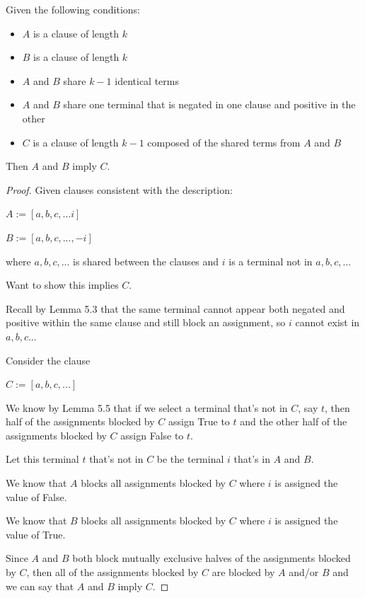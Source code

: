 \documentclass[manuscript]{acmart}
\begin{document}
    \begin{lemma}[Reduction]
        Given the following conditions:
        \begin{itemize}
            \item $A$ is a clause of length $k$
            \item $B$ is a clause of length $k$
            \item $A$ and $B$ share $k-1$ identical terms
            \item $A$ and $B$ share one terminal that is negated in one clause
            and positive in the other
            \item $C$ is a clause of length $k-1$ composed of the shared terms
            from $A$ and $B$
        \end{itemize}
        Then $A$ and $B$ imply $C$.
    \end{lemma}
    \begin{proof}
        Given clauses consistent with the description:

        $A := [a, b, c, ... i]$

        $B := [a, b, c, ..., -i]$

        where $a, b, c, ...$ is shared between the clauses and $i$ is a terminal not in $a, b, c, ...$

        Want to show this implies $C$.

        Recall by Lemma 5.3 that the same terminal cannot appear both negated and positive within the same clause and still block an assignment, so $i$ cannot exist in $a, b, c...$

        Consider the clause

        $C := [a, b, c, ...]$

        We know by Lemma 5.5 that if we select a terminal that's not in $C$, say $t$, then half of the assignments blocked by $C$ assign True to $t$ and the other half of the assignments blocked by $C$ assign False to $t$.

        Let this terminal $t$ that's not in $C$ be the terminal $i$ that's in $A$ and $B$.

        We know that $A$ blocks all assignments blocked by $C$ where $i$ is assigned the value of False.

        We know that $B$ blocks all assignments blocked by $C$ where $i$ is assigned the value of True.

        Since $A$ and $B$ both block mutually exclusive halves of the assignments blocked by $C$, then all of the assignments blocked by $C$ are blocked by $A$ and/or $B$ and we can say that $A$ and $B$ imply $C$.
    \end{proof}
\end{document}
